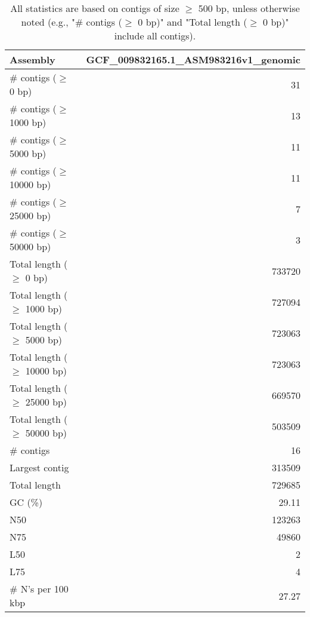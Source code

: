 \documentclass[12pt,a4paper]{article}
\begin{document}
\begin{table}[ht]
\begin{center}
\caption{All statistics are based on contigs of size $\geq$ 500 bp, unless otherwise noted (e.g., "\# contigs ($\geq$ 0 bp)" and "Total length ($\geq$ 0 bp)" include all contigs).}
\begin{tabular}{|l*{1}{|r}|}
\hline
Assembly & GCF\_009832165.1\_ASM983216v1\_genomic \\ \hline
\# contigs ($\geq$ 0 bp) & 31 \\ \hline
\# contigs ($\geq$ 1000 bp) & 13 \\ \hline
\# contigs ($\geq$ 5000 bp) & 11 \\ \hline
\# contigs ($\geq$ 10000 bp) & 11 \\ \hline
\# contigs ($\geq$ 25000 bp) & 7 \\ \hline
\# contigs ($\geq$ 50000 bp) & 3 \\ \hline
Total length ($\geq$ 0 bp) & 733720 \\ \hline
Total length ($\geq$ 1000 bp) & 727094 \\ \hline
Total length ($\geq$ 5000 bp) & 723063 \\ \hline
Total length ($\geq$ 10000 bp) & 723063 \\ \hline
Total length ($\geq$ 25000 bp) & 669570 \\ \hline
Total length ($\geq$ 50000 bp) & 503509 \\ \hline
\# contigs & 16 \\ \hline
Largest contig & 313509 \\ \hline
Total length & 729685 \\ \hline
GC (\%) & 29.11 \\ \hline
N50 & 123263 \\ \hline
N75 & 49860 \\ \hline
L50 & 2 \\ \hline
L75 & 4 \\ \hline
\# N's per 100 kbp & 27.27 \\ \hline
\end{tabular}
\end{center}
\end{table}
\end{document}
